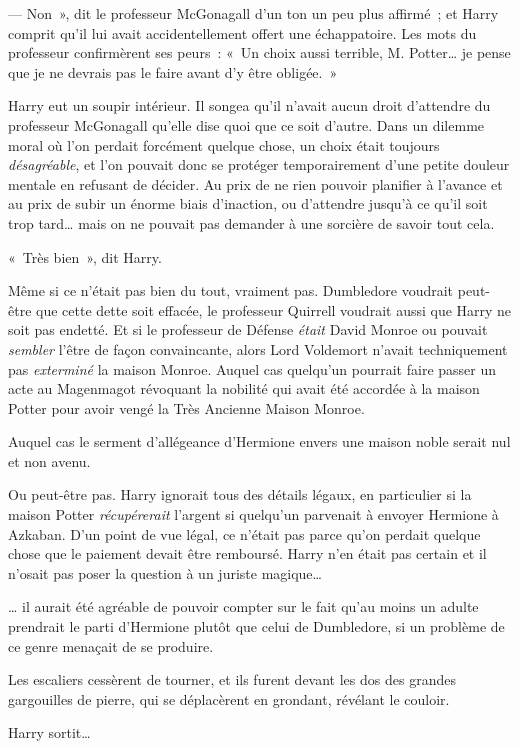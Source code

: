 --- Non~», dit le professeur McGonagall d'un ton un peu plus affirmé~; et Harry comprit qu'il lui avait accidentellement offert une échappatoire. Les mots du professeur confirmèrent ses peurs~: «~Un choix aussi terrible, M. Potter… je pense que je ne devrais pas le faire avant d'y être obligée.~»

Harry eut un soupir intérieur. Il songea qu'il n'avait aucun droit d'attendre du professeur McGonagall qu'elle dise quoi que ce soit d'autre. Dans un dilemme moral où l'on perdait forcément quelque chose, un choix était toujours \emph{désagréable}, et l'on pouvait donc se protéger temporairement d'une petite douleur mentale en refusant de décider. Au prix de ne rien pouvoir planifier à l'avance et au prix de subir un énorme biais d'inaction, ou d'attendre jusqu'à ce qu'il soit trop tard… mais on ne pouvait pas demander à une sorcière de savoir tout cela.

«~Très bien~», dit Harry.

Même si ce n'était pas bien du tout, vraiment pas. Dumbledore voudrait peut-être que cette dette soit effacée, le professeur Quirrell voudrait aussi que Harry ne soit pas endetté. Et si le professeur de Défense \emph{était} David Monroe ou pouvait \emph{sembler} l'être de façon convaincante, alors Lord Voldemort n'avait techniquement pas \emph{exterminé} la maison Monroe. Auquel cas quelqu'un pourrait faire passer un acte au Magenmagot révoquant la nobilité qui avait été accordée à la maison Potter pour avoir vengé la Très Ancienne Maison Monroe.

Auquel cas le serment d'allégeance d'Hermione envers une maison noble serait nul et non avenu.

Ou peut-être pas. Harry ignorait tous des détails légaux, en particulier si la maison Potter \emph{récupérerait} l'argent si quelqu'un parvenait à envoyer Hermione à Azkaban. D'un point de vue légal, ce n'était pas parce qu'on perdait quelque chose que le paiement devait être remboursé. Harry n'en était pas certain et il n'osait pas poser la question à un juriste magique…

… il aurait été agréable de pouvoir compter sur le fait qu'au moins un adulte prendrait le parti d'Hermione plutôt que celui de Dumbledore, si un problème de ce genre menaçait de se produire.

Les escaliers cessèrent de tourner, et ils furent devant les dos des grandes gargouilles de pierre, qui se déplacèrent en grondant, révélant le couloir.

Harry sortit…

